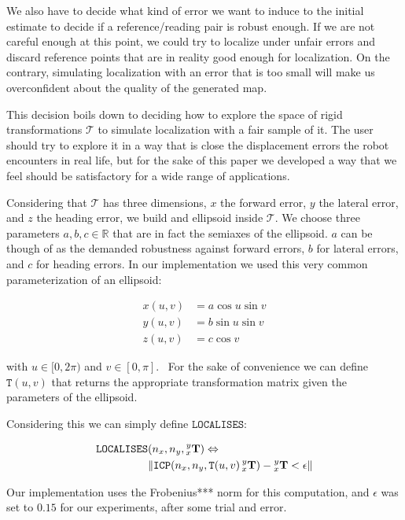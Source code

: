 \documentclass[letterpaper,10 pt,conference]{ieeeconf}
\newcommand{\mat}[1]{\mathbf{#1}}
\begin{document}
We also have to decide what kind of error we want to induce to the initial
estimate to decide if a reference/reading pair is robust enough. 
If we are not careful enough at this point, we could try to localize under
unfair errors and discard reference points that are in reality good enough for
localization.
On the contrary, simulating localization with an error that is too small will
make us overconfident about the quality of the generated map.

This decision boils down to deciding how to explore the space of rigid
transformations $\mathcal{T}$ to simulate localization with a fair sample of it.
The user should try to explore it in a way that is close the displacement errors
the robot encounters in real life, but for the sake of this paper we developed a
way that we feel should be satisfactory for a wide range of applications.

Considering that $\mathcal{T}$ has three dimensions, $x$ the forward error, $y$
the lateral error, and $z$ the heading error, we build and ellipsoid inside
$\mathcal{T}$.
We choose three parameters $a, b, c \in \mathbb{R}$ that are in fact the
semiaxes of the ellipsoid. $a$ can be though of as the demanded robustness
against forward errors, $b$ for lateral errors, and $c$ for heading errors.
In our implementation we used this very common parameterization of an ellipsoid:

\begin{align*}
x(u,v) &= a \cos u \sin v \\
y(u,v) &= b \sin u \sin v \\
z(u,v) &= c \cos v
\end{align*}

with $u \in [0,2\pi)$ and $v \in [0,\pi]$. \
For the sake of convenience we can define $\texttt{T}(u,v)$ that returns the
appropriate transformation matrix given the parameters of the ellipsoid.

Considering this we can simply define $\texttt{LOCALISES}$:

\begin{align}
\texttt{LOCALISES}&(n_x, n_y, \prescript{y}{x}{ \mat{T} }) \Leftrightarrow  \\
&\| \texttt{ICP}(n_x, n_y, \texttt{T}(u,v) \prescript{y}{x}{\mat{T}}) - \prescript{y}{x}{ \mat{T} } < \epsilon \|
\end{align}

Our implementation uses the Frobenius*** norm for this computation, and $\epsilon$
was set to $0.15$ for our experiments, after some trial and error.
\end{document}
